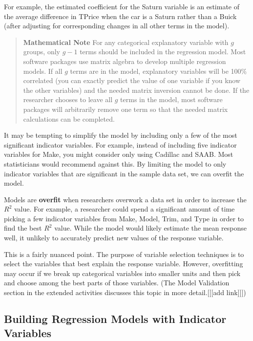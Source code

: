 \documentclass[
]{report}
\begin{document}
For example, the estimated coefficient for the Saturn variable is an estimate of the average difference in TPrice when the car is a Saturn rather than a Buick (after adjusting for corresponding changes in all other terms in the model).

\begin{quote}
\textbf{Mathematical Note}
For any categorical explanatory variable with \(g\) groups, only \(g - 1\) terms should be included in the regression model. Most software packages use matrix algebra to develop multiple regression models. If all \(g\) terms are in the model, explanatory variables will be 100\% correlated (you can exactly predict the value of one variable if you know the other variables) and the needed matrix inversion cannot be done. If
the researcher chooses to leave all \(g\) terms in the model, most software packages will arbitrarily remove one term so that the needed matrix calculations can be completed.
\end{quote}

It may be tempting to simplify the model by including only a few of the most significant indicator variables. For example, instead of including five indicator variables for Make, you might consider only using Cadillac and SAAB. Most statisticians would recommend against this. By limiting the model to only indicator
variables that are significant in the sample data set, we can overfit the model.

Models are \textbf{overfit} when researchers overwork a data set in order to increase the \(R^2\) value. For example, a researcher could spend a significant amount of time picking a few indicator variables from Make, Model, Trim, and Type in order to find the best \(R^2\) value. While the model would likely estimate the mean response well, it unlikely to accurately predict new values of the response variable.

This is a fairly nuanced point. The purpose of variable selection techniques is to select the variables that best explain the response variable. However, overfitting may occur if we break up categorical variables into smaller units and then pick and choose among the best parts of those variables. (The Model Validation section
in the extended activities discusses this topic in more detail.{[}{[}{[}add link{]}{]}{]})

\subsection*{Building Regression Models with Indicator Variables}\label{building-regression-models-with-indicator-variables}
\end{document}
